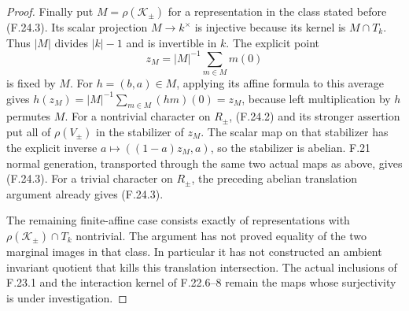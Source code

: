 \begin{proof}
Finally put $M=\rho(\mathcal K_\pm)$ for a representation
in the class stated before (F.24.3). Its scalar
projection $M\to k^\times$ is injective because its
kernel is $M\cap T_k$. Thus $|M|$ divides $|k|-1$
and is invertible in $k$. The explicit point
\[
                     z_M=|M|^{-1}\sum_{m\in M}m(0)            \tag{F.24.16}
\]
is fixed by $M$. For $h=(b,a)\in M$, applying its
affine formula to this average gives
$h(z_M)=|M|^{-1}\sum_{m\in M}(hm)(0)=z_M$, because
left multiplication by $h$ permutes $M$.
For a nontrivial character on $R_\pm$, (F.24.2) and
its stronger assertion put all of $\rho(V_\pm)$ in
the stabilizer of $z_M$. The scalar map on that
stabilizer has the explicit inverse
$a\mapsto((1-a)z_M,a)$, so the stabilizer is abelian.
F.21 normal generation, transported through the same
two actual maps as above, gives (F.24.3). For a
trivial character on $R_\pm$, the preceding abelian
translation argument already gives (F.24.3).

The remaining finite-affine case consists exactly of
representations with $\rho(\mathcal K_\pm)\cap T_k$
nontrivial. The argument has not proved equality of
the two marginal images in that class. In particular
it has not constructed an ambient invariant quotient
that kills this translation intersection. The actual
inclusions of F.23.1 and the interaction kernel of
F.22.6--8 remain the maps whose surjectivity is under
investigation.
\end{proof}

